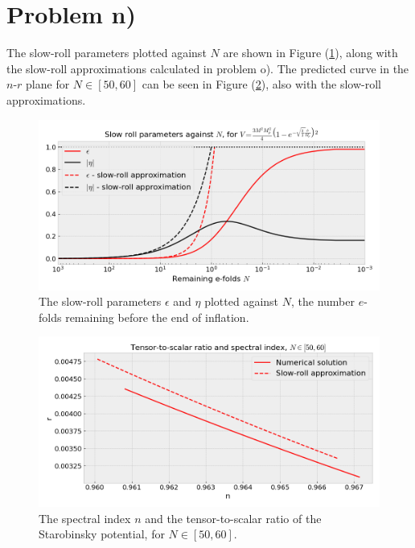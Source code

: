 \documentclass[reprint,english,notitlepage]{revtex4-1}  %
\numberwithin{equation}{section}
\begin{document}
\section{Problem n)}
The slow-roll parameters plotted against $N$ are shown in Figure
(\ref{fig:starobinsky_slowroll-N}), along with the slow-roll approximations
calculated in problem o). The predicted curve in the $n$-$r$ plane for
$N\in[50,60]$ can be seen in Figure (\ref{fig:starobinsky_slowroll-nr}), also
with the slow-roll approximations.

\begin{figure}[h!]
	\includegraphics[width=\linewidth]{StarobinskyPotential_slowroll-N.png}
	\caption{The slow-roll parameters $\epsilon$ and $\eta$ plotted against
	$N$, the number $e$-folds remaining before the end of inflation.}
	\label{fig:starobinsky_slowroll-N}
\end{figure}


\begin{figure}[h!]
	\includegraphics[width=\linewidth]{StarobinskyPotential_slowroll-nr.png}
	\caption{The spectral index $n$ and the tensor-to-scalar ratio of the
	Starobinsky potential, for $N\in[50,60]$.}
	\label{fig:starobinsky_slowroll-nr}
\end{figure}
\end{document}
